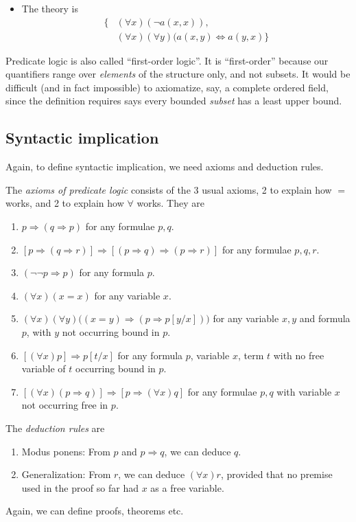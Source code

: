 \documentclass[a4paper]{article}
\begin{document}
\begin{eg}
\begin{enumerate}
\begin{itemize}
      \item The theory is
        \begin{align*}
          \{& (\forall x)(\neg a(x, x)),\\
            & (\forall x)(\forall y)(a(x, y)\Leftrightarrow a(y, x)\}
          \end{align*}
    \end{itemize}
\end{enumerate}
Predicate logic is also called ``first-order logic''. It is ``first-order'' because our quantifiers range over \emph{elements} of the structure only, and not subsets. It would be difficult (and in fact impossible) to axiomatize, say, a complete ordered field, since the definition requires says every bounded \emph{subset} has a least upper bound.
\end{eg}

\subsection{Syntactic implication}
Again, to define syntactic implication, we need axioms and deduction rules.
\begin{defi}
  The \emph{axioms of predicate logic} consists of the 3 usual axioms, 2 to explain how $=$ works, and 2 to explain how $\forall$ works. They are
  \begin{enumerate}[label=\arabic{*}.]
    \item $p\Rightarrow (q\Rightarrow p)$ for any formulae $p, q$.
    \item $[p\Rightarrow (q\Rightarrow r)] \Rightarrow [(p\Rightarrow q)\Rightarrow (p\Rightarrow r)]$ for any formulae $p, q, r$.
    \item $(\neg \neg p\Rightarrow p)$ for any formula $p$.
    \item $(\forall x)(x = x)$ for any variable $x$.
    \item $(\forall x)(\forall y)\big((x = y)\Rightarrow (p \Rightarrow p[y/x])\big)$ for any variable $x, y$ and formula $p$, with $y$ not occurring bound in $p$.
    \item $[(\forall x)p] \Rightarrow p[t/x]$ for any formula $p$, variable $x$, term $t$ with no free variable of $t$ occurring bound in $p$.
    \item $[(\forall x)(p\Rightarrow q)]\Rightarrow [p\Rightarrow (\forall x)q]$ for any formulae $p, q$ with variable $x$ not occurring free in $p$.
  \end{enumerate}
  The \emph{deduction rules} are
  \begin{enumerate}[label=\arabic{*}.]
    \item Modus ponens: From $p$ and $p\Rightarrow q$, we can deduce $q$.
    \item Generalization: From $r$, we can deduce $(\forall x)r$, provided that no premise used in the proof so far had $x$ as a free variable.
  \end{enumerate}
\end{defi}
Again, we can define proofs, theorems etc.
\end{document}
